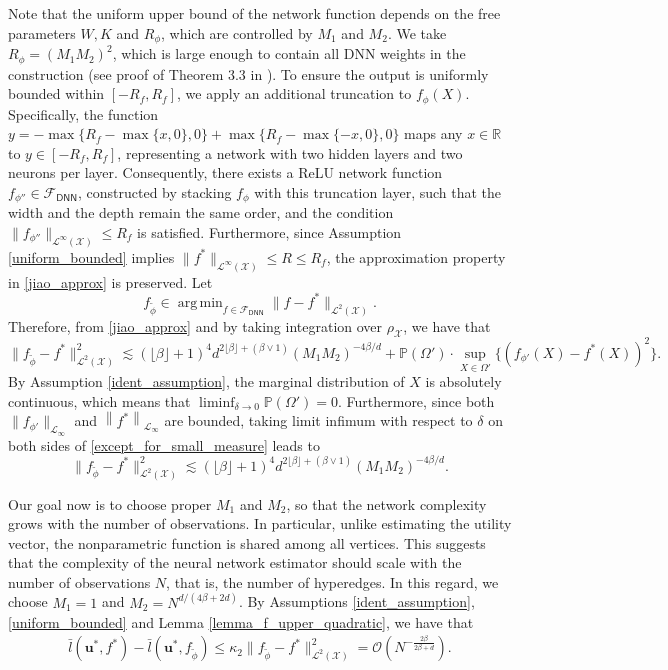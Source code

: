 \documentclass[
  12pt]{article}
\DeclareMathOperator*{\argmin}{arg\,min}
\begin{document}
Note that the uniform upper bound of the network function depends on the free parameters $W,K$ and $R_\phi$, which are controlled by $M_1$ and $M_2$. We take $R_\phi=(M_1M_2)^2$, which is large enough to contain all DNN weights in the construction (see proof of Theorem 3.3 in \cite{jiao_deepnonparametric}). To ensure the output is uniformly bounded within $[-R_f, R_f]$, we apply an additional truncation to $f_{\phi}(X)$. Specifically, the function $y=-\max \{R_f-\max \{x, 0\}, 0\}+\max \{R_f-\max \{-x, 0\}, 0\}$ maps any $x \in \mathbb{R}$ to $y \in[-R_f, R_f]$, representing a network with two hidden layers and two neurons per layer. Consequently, there exists a ReLU network function $f_{\phi''} \in \mathcal{F}_{\mathsf{DNN}}$, constructed by stacking $f_{\phi}$ with this truncation layer, such that the width and the depth remain the same order, and the condition $\|f_{\phi''}\|_{\mathcal{L}^\infty(\mathcal{X})} \leq R_f$ is satisfied. Furthermore, since Assumption \ref{uniform_bounded} implies $\|f^*\|_{\mathcal{L}^\infty(\mathcal{X})} \leq R \leq R_f$, the approximation property in \eqref{jiao_approx} is preserved. Let 
$$f_{\widetilde{\phi}} \in \argmin_{ f \in \mathcal{F}_{\mathsf{DNN}}}\|f-f^*\|_{\mathcal{L}^2(\mathcal{X})}.$$
Therefore, from \eqref{jiao_approx} and by taking integration over $\rho_\mathcal{X}$, we have that
\begin{equation}\label{except_for_small_measure}
\|f_{\widetilde{\phi}}-f^*\|^2_{\mathcal{L}^2(\mathcal{X})} \lesssim (\lfloor\beta\rfloor+1)^4 d^{2\lfloor\beta\rfloor+(\beta \vee 1)}(M_1 M_2)^{-4 \beta / d}+\mathbb{P}(\Omega') \cdot \sup_{X \in \Omega'}\{(f_{\phi'}(X)-f^*(X))^2\}.
\end{equation}
By Assumption \ref{ident_assumption}, the marginal distribution of $X$ is absolutely continuous, which means that $\liminf _{\delta \rightarrow 0} \mathbb{P}(\Omega')=0$. Furthermore, since both $\|f_{\phi'}\|_{\mathcal{L}_\infty}$ and $\left\|f^*\right\|_{\mathcal{L}_\infty}$ are bounded, taking limit infimum with respect to $\delta$ on both sides of \eqref{except_for_small_measure} leads to
$$\|f_{\widetilde{\phi}}-f^*\|^2_{\mathcal{L}^2(\mathcal{X})} \lesssim (\lfloor\beta\rfloor+1)^4 d^{2\lfloor\beta\rfloor+(\beta \vee 1)}(M_1 M_2)^{-4 \beta / d}.$$

Our goal now is to choose proper $M_1$ and $M_2$, so that the network complexity grows with the number of observations. In particular, unlike estimating the utility vector, the nonparametric function is shared among all vertices. This suggests that the complexity of the neural network estimator should scale with the number of observations $N$, that is, the number of hyperedges. In this regard, we choose $M_1=1$ and $M_2=N^{d/(4\beta+2d)}$. By Assumptions \ref{ident_assumption}, \ref{uniform_bounded} and Lemma \ref{lemma_f_upper_quadratic}, we have that
\begin{equation}\label{jiao_approx2}
\begin{aligned}
     \bar{l}(\boldsymbol{u}^*,f^*)-\bar{l}(\boldsymbol{u}^*,f_{\widetilde{\phi}})\leq \kappa_2 \| f_{\widetilde{\phi}}-f^* \|^2_{\mathcal{L}^2(\mathcal{X})} = \mathcal{O}( N^{-\frac{2 \beta}{2\beta +d}}).
\end{aligned}\end{equation}
\end{document}
